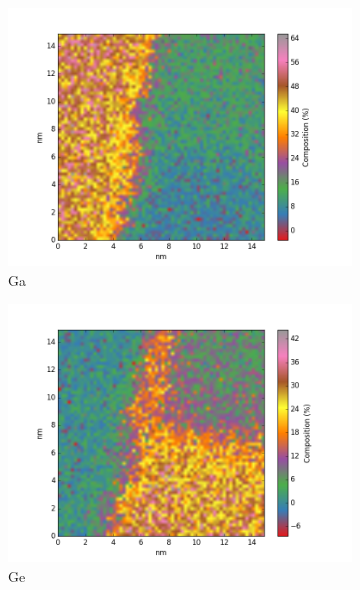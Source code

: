 \begin{figure}
\begin{subfigure}{0.45\textwidth}
		\includegraphics[width=\textwidth]{fig/q-new/E/oldzeta/Ga_zeta}
		\caption{Ga}
		\label{fig:Ega}
	\end{subfigure}%
	\hfill
	\begin{subfigure}{0.45\textwidth}
		\includegraphics[width=\textwidth]{fig/q-new/E/oldzeta/Ge_zeta}
		\caption{Ge}
		\label{fig:Ege}
	\end{subfigure}
	\begin{subfigure}{0.45\textwidth}

\end{subfigure}
\end{figure}
